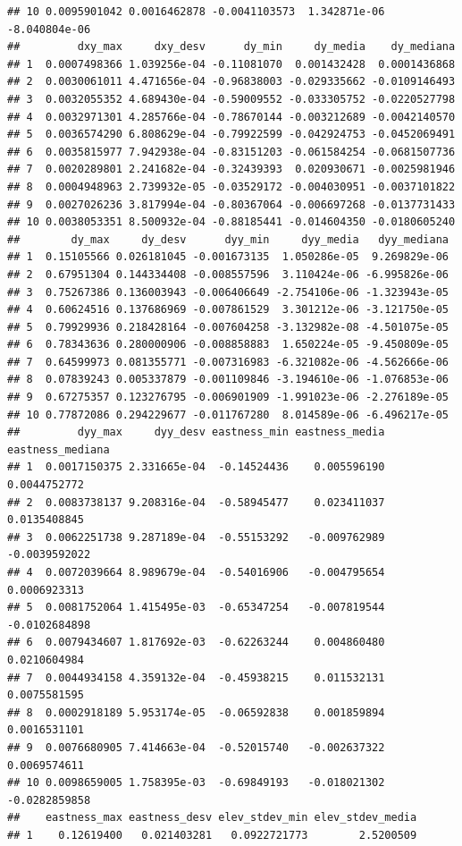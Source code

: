 \documentclass[11pt,]{article}
\begin{document}
\begin{verbatim}
## 10 0.0095901042 0.0016462878 -0.0041103573  1.342871e-06 -8.040804e-06
##         dxy_max     dxy_desv      dy_min     dy_media    dy_mediana
## 1  0.0007498366 1.039256e-04 -0.11081070  0.001432428  0.0001436868
## 2  0.0030061011 4.471656e-04 -0.96838003 -0.029335662 -0.0109146493
## 3  0.0032055352 4.689430e-04 -0.59009552 -0.033305752 -0.0220527798
## 4  0.0032971301 4.285766e-04 -0.78670144 -0.003212689 -0.0042140570
## 5  0.0036574290 6.808629e-04 -0.79922599 -0.042924753 -0.0452069491
## 6  0.0035815977 7.942938e-04 -0.83151203 -0.061584254 -0.0681507736
## 7  0.0020289801 2.241682e-04 -0.32439393  0.020930671 -0.0025981946
## 8  0.0004948963 2.739932e-05 -0.03529172 -0.004030951 -0.0037101822
## 9  0.0027026236 3.817994e-04 -0.80367064 -0.006697268 -0.0137731433
## 10 0.0038053351 8.500932e-04 -0.88185441 -0.014604350 -0.0180605240
##        dy_max     dy_desv      dyy_min     dyy_media   dyy_mediana
## 1  0.15105566 0.026181045 -0.001673135  1.050286e-05  9.269829e-06
## 2  0.67951304 0.144334408 -0.008557596  3.110424e-06 -6.995826e-06
## 3  0.75267386 0.136003943 -0.006406649 -2.754106e-06 -1.323943e-05
## 4  0.60624516 0.137686969 -0.007861529  3.301212e-06 -3.121750e-05
## 5  0.79929936 0.218428164 -0.007604258 -3.132982e-08 -4.501075e-05
## 6  0.78343636 0.280000906 -0.008858883  1.650224e-05 -9.450809e-05
## 7  0.64599973 0.081355771 -0.007316983 -6.321082e-06 -4.562666e-06
## 8  0.07839243 0.005337879 -0.001109846 -3.194610e-06 -1.076853e-06
## 9  0.67275357 0.123276795 -0.006901909 -1.991023e-06 -2.276189e-05
## 10 0.77872086 0.294229677 -0.011767280  8.014589e-06 -6.496217e-05
##         dyy_max     dyy_desv eastness_min eastness_media eastness_mediana
## 1  0.0017150375 2.331665e-04  -0.14524436    0.005596190     0.0044752772
## 2  0.0083738137 9.208316e-04  -0.58945477    0.023411037     0.0135408845
## 3  0.0062251738 9.287189e-04  -0.55153292   -0.009762989    -0.0039592022
## 4  0.0072039664 8.989679e-04  -0.54016906   -0.004795654     0.0006923313
## 5  0.0081752064 1.415495e-03  -0.65347254   -0.007819544    -0.0102684898
## 6  0.0079434607 1.817692e-03  -0.62263244    0.004860480     0.0210604984
## 7  0.0044934158 4.359132e-04  -0.45938215    0.011532131     0.0075581595
## 8  0.0002918189 5.953174e-05  -0.06592838    0.001859894     0.0016531101
## 9  0.0076680905 7.414663e-04  -0.52015740   -0.002637322     0.0069574611
## 10 0.0098659005 1.758395e-03  -0.69849193   -0.018021302    -0.0282859858
##    eastness_max eastness_desv elev_stdev_min elev_stdev_media
## 1    0.12619400   0.021403281   0.0922721773        2.5200509

\end{verbatim}
\end{document}
